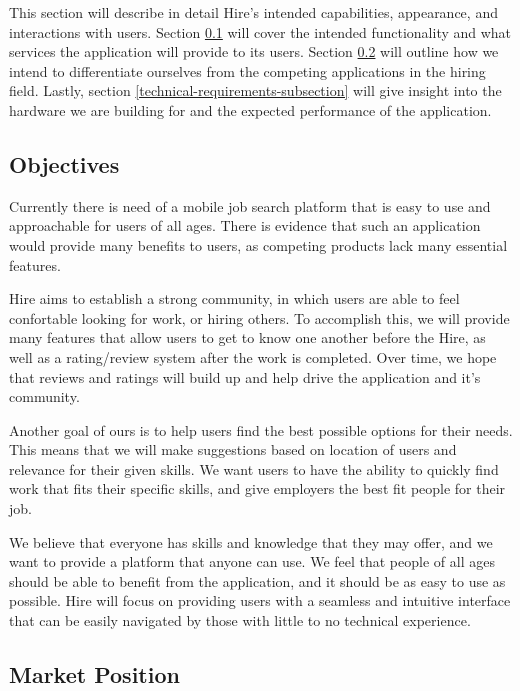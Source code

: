 \documentclass[11pt]{article}
\begin{document}
This section will describe in detail Hire's intended capabilities, appearance, and interactions with users. Section \ref{objectives-subsection} will cover the intended functionality and what services the application will provide to its users. Section \ref{market-subsection} will outline how we intend to differentiate ourselves from the competing applications in the hiring field. Lastly, section \ref{technical-requirements-subsection} will give insight into the hardware we are building for and the expected performance of the application.

\subsection{Objectives}\label{objectives-subsection}


Currently there is need of a mobile job search platform that is easy to use and approachable for users of all ages. There is evidence that such an application would provide many benefits to users, as competing products lack many essential features.

Hire aims to establish a strong community, in which users are able to feel confortable looking for work, or hiring others. To accomplish this, we will provide many features that allow users to get to know one another before the Hire, as well as a rating/review system after the work is completed. Over time, we hope that reviews and ratings will build up and help drive the application and it's community.

Another goal of ours is to help users find the best possible options for their needs. This means that we will make suggestions based on location of users and relevance for their given skills. We want users to have the ability to quickly find work that fits their specific skills, and give employers the best fit people for their job.

We believe that everyone has skills and knowledge that they may offer, and we want to provide a platform that anyone can use. We feel that people of all ages should be able to benefit from the application, and it should be as easy to use as possible. Hire will focus on providing users with a seamless and intuitive interface that can be easily navigated by those with little to no technical experience.

\subsection{Market Position}\label{market-subsection}
\end{document}
